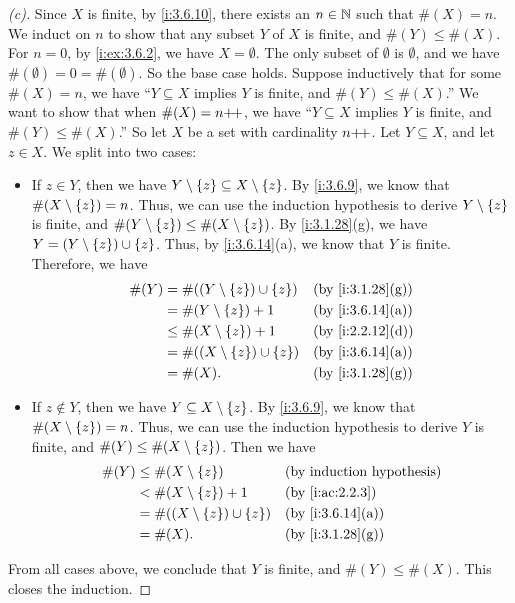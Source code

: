 \begin{proof}[(c)]
  Since \(X\) is finite, by \cref{i:3.6.10}, there exists an \(n \in \mathbb{N}\) such that \(\#(X) = n\).
  We induct on \(n\) to show that any subset \(Y\) of \(X\) is finite, and \(\#(Y) \leq \#(X)\).
  For \(n = 0\), by \cref{i:ex:3.6.2}, we have \(X = \emptyset\).
  The only subset of \(\emptyset\) is \(\emptyset\), and we have \(\#(\emptyset) = 0 = \#(\emptyset)\).
  So the base case holds.
  Suppose inductively that for some \(\#(X) = n\), we have ``\(Y \subseteq X\) implies \(Y\) is finite, and \(\#(Y) \leq \#(X)\).''
  We want to show that when \(\#(X) = n{+}\!{+}\), we have ``\(Y \subseteq X\) implies \(Y\) is finite, and \(\#(Y) \leq \#(X)\).''
  So let \(X\) be a set with cardinality \(n{+}\!{+}\).
  Let \(Y \subseteq X\), and let \(z \in X\).
  We split into two cases:
  \begin{itemize}
    \item If \(z \in Y\), then we have \(Y \setminus \left\lbrace z\right\rbrace \subseteq X \setminus \left\lbrace z\right\rbrace\).
          By \cref{i:3.6.9}, we know that \(\#(X \setminus \left\lbrace z\right\rbrace) = n\).
          Thus, we can use the induction hypothesis to derive \(Y \setminus \left\lbrace z\right\rbrace\) is finite, and \(\#(Y \setminus \left\lbrace z\right\rbrace) \leq \#(X \setminus \left\lbrace z\right\rbrace)\).
          By \cref{i:3.1.28}(g), we have \(Y = (Y \setminus \left\lbrace z\right\rbrace) \cup \left\lbrace z\right\rbrace\).
          Thus, by \cref{i:3.6.14}(a), we know that \(Y\) is finite.
          Therefore, we have
          \begin{align*}
            \#(Y) & = \#((Y \setminus \set{z}) \cup \set{z}) &  & \by{i:3.1.28}[g] \\
                  & = \#(Y \setminus \set{z}) + 1            &  & \by{i:3.6.14}[a] \\
                  & \leq \#(X \setminus \set{z}) + 1         &  & \by{i:2.2.12}[d] \\
                  & = \#((X \setminus \set{z}) \cup \set{z}) &  & \by{i:3.6.14}[a] \\
                  & = \#(X).                                 &  & \by{i:3.1.28}[g]
          \end{align*}
    \item If \(z \notin Y\), then we have \(Y \subseteq X \setminus \left\lbrace z\right\rbrace\).
          By \cref{i:3.6.9}, we know that \(\#(X \setminus \left\lbrace z\right\rbrace) = n\).
          Thus, we can use the induction hypothesis to derive \(Y\) is finite, and \(\#(Y) \leq \#(X \setminus \left\lbrace z\right\rbrace)\).
          Then we have
          \begin{align*}
            \#(Y) & \leq \#(X \setminus \set{z})             &  & \byIH            \\
                  & < \#(X \setminus \set{z}) + 1            &  & \by{i:ac:2.2.3}  \\
                  & = \#((X \setminus \set{z}) \cup \set{z}) &  & \by{i:3.6.14}[a] \\
                  & = \#(X).                                 &  & \by{i:3.1.28}[g]
          \end{align*}
  \end{itemize}
  From all cases above, we conclude that \(Y\) is finite, and \(\#(Y) \leq \#(X)\).
  This closes the induction.


\end{proof}
